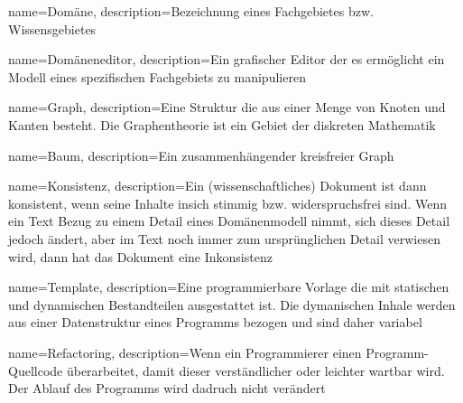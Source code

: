 {
  name=Domäne,
  description={Bezeichnung eines Fachgebietes bzw. Wissensgebietes}
}

{
  name=Domäneneditor,
  description={Ein grafischer Editor der es ermöglicht ein Modell eines spezifischen Fachgebiets zu manipulieren}
}

{
  name=Graph,
  description={Eine Struktur die aus einer Menge von Knoten und Kanten besteht. Die Graphentheorie ist ein Gebiet der diskreten Mathematik}
}

{
  name=Baum,
  description={Ein zusammenhängender kreisfreier Graph}
}

{
  name=Konsistenz,
  description={Ein (wissenschaftliches) Dokument ist dann konsistent, wenn seine Inhalte insich stimmig bzw. widerspruchsfrei sind. Wenn ein Text Bezug zu einem Detail eines Domänenmodell nimmt, sich dieses Detail jedoch ändert, aber im Text noch immer zum ursprünglichen Detail verwiesen wird, dann hat das Dokument eine Inkonsistenz}
}

{
  name=Template,
  description={Eine programmierbare Vorlage die mit statischen und dynamischen Bestandteilen ausgestattet ist. Die dymanischen Inhale werden aus einer Datenstruktur eines Programms bezogen und sind daher variabel}
}

{
  name=Refactoring,
  description={Wenn ein Programmierer einen Programm-Quellcode überarbeitet, damit dieser verständlicher oder leichter wartbar wird. Der Ablauf des Programms wird dadruch nicht verändert}
}




